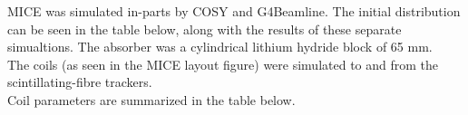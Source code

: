 \documentclass[portrait,a0paper,fontscale=0.285]{baposter} %
\begin{document}
\begin{poster}
{
MICE was simulated in-parts by COSY and G4Beamline. The initial distribution can be seen in the table below, along with the results of these separate simualtions.
The absorber was a cylindrical lithium hydride block of 65 mm.\\
The coils (as seen in the MICE layout figure) were simulated to and from the scintillating-fibre trackers.\\
Coil parameters are summarized in the table below.
}



\end{poster}
\end{document}
